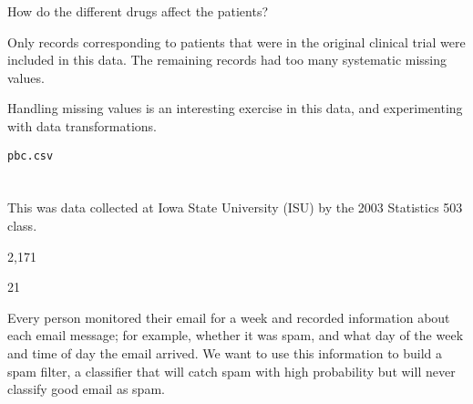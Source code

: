 \bigskip
{} How do the different drugs affect the patients?

\bigskip
{} Only records corresponding to patients 
that were in the original clinical trial were included in this data.
The remaining records had too many systematic missing values.

\bigskip
{} Handling missing values is an interesting 
exercise in this data, and experimenting with data transformations.

\bigskip
{}

\smallskip 
{\tt pbc.csv}

\section{}

 This was data collected at Iowa State
University (ISU) by the 2003 Statistics 503 class.

\bigskip
{} 2,171

 21

\smallskip
{} Every person monitored their email for a
week and recorded information about each email message; for example,
whether it was spam, and what day of the week and time of day the
email arrived. We want to use this information to build a spam filter,
a classifier that will catch spam with high probability but will
never classify good email as spam.

